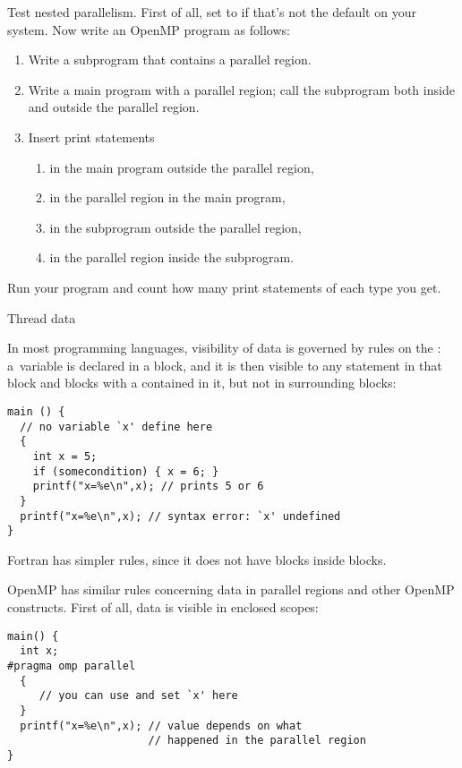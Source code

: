 \begin{exercise}
  Test nested parallelism. First of all, set  to
   if that's not the default on your system.
  Now write an OpenMP program as follows:
  \begin{enumerate}
  \item Write a subprogram that contains a parallel region.
  \item Write a main program with a parallel region; call the subprogram both inside and outside the parallel region.
    \item Insert print statements 
      \begin{enumerate}
      \item in the main program outside the parallel region,
      \item in the parallel region in the main program,
      \item in the subprogram outside the parallel region,
      \item in the parallel region inside the subprogram.
      \end{enumerate}
  \end{enumerate}
  Run your program and count how many print statements of each type you get.
\end{exercise}

 {Thread data}

In most programming languages, visibility of data
is governed by rules on the :
a~variable is declared in a block, and it is then visible to any
statement in that block and blocks with a 
contained in it, but not in surrounding blocks:
\begin{verbatim}
main () {
  // no variable `x' define here
  {
    int x = 5;
    if (somecondition) { x = 6; }
    printf("x=%e\n",x); // prints 5 or 6
  }
  printf("x=%e\n",x); // syntax error: `x' undefined
}
\end{verbatim}
Fortran has simpler rules, since it does not have blocks inside blocks.

OpenMP has similar rules concerning data in parallel regions
and other OpenMP constructs. First of all, data is visible
in enclosed scopes:
\begin{verbatim}
main() {
  int x;
#pragma omp parallel
  {
     // you can use and set `x' here
  }
  printf("x=%e\n",x); // value depends on what
                      // happened in the parallel region
}
\end{verbatim}


